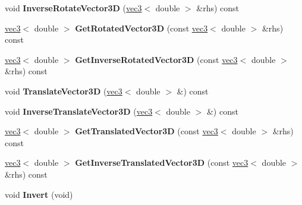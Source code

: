 \begin{DoxyCompactItemize}
\item 
\hypertarget{classmath_1_1mat44_a47e1b4c2b8a7402cbe2f810d9ad17e48}{
void {\bfseries InverseRotateVector3D} (\hyperlink{classmath_1_1vec3}{vec3}$<$ double $>$ \&rhs) const }
\label{classmath_1_1mat44_a47e1b4c2b8a7402cbe2f810d9ad17e48}

\item 
\hypertarget{classmath_1_1mat44_aef14aa49d3b4d63a891b7058516e9cb3}{
\hyperlink{classmath_1_1vec3}{vec3}$<$ double $>$ {\bfseries GetRotatedVector3D} (const \hyperlink{classmath_1_1vec3}{vec3}$<$ double $>$ \&rhs) const }
\label{classmath_1_1mat44_aef14aa49d3b4d63a891b7058516e9cb3}

\item 
\hypertarget{classmath_1_1mat44_a5cae23cf2b5f880e955b0a61590e9ccc}{
\hyperlink{classmath_1_1vec3}{vec3}$<$ double $>$ {\bfseries GetInverseRotatedVector3D} (const \hyperlink{classmath_1_1vec3}{vec3}$<$ double $>$ \&rhs) const }
\label{classmath_1_1mat44_a5cae23cf2b5f880e955b0a61590e9ccc}

\item 
\hypertarget{classmath_1_1mat44_ad89781736c0f006bb60be5683e5a707b}{
void {\bfseries TranslateVector3D} (\hyperlink{classmath_1_1vec3}{vec3}$<$ double $>$ \&) const }
\label{classmath_1_1mat44_ad89781736c0f006bb60be5683e5a707b}

\item 
\hypertarget{classmath_1_1mat44_afd776d21e9157bf6d874aa14c0e340b6}{
void {\bfseries InverseTranslateVector3D} (\hyperlink{classmath_1_1vec3}{vec3}$<$ double $>$ \&) const }
\label{classmath_1_1mat44_afd776d21e9157bf6d874aa14c0e340b6}

\item 
\hypertarget{classmath_1_1mat44_a00b596b2c158263d4f5ee44f6bf314ae}{
\hyperlink{classmath_1_1vec3}{vec3}$<$ double $>$ {\bfseries GetTranslatedVector3D} (const \hyperlink{classmath_1_1vec3}{vec3}$<$ double $>$ \&rhs) const }
\label{classmath_1_1mat44_a00b596b2c158263d4f5ee44f6bf314ae}

\item 
\hypertarget{classmath_1_1mat44_a3a507ad33927391da88d2aaa928b15e6}{
\hyperlink{classmath_1_1vec3}{vec3}$<$ double $>$ {\bfseries GetInverseTranslatedVector3D} (const \hyperlink{classmath_1_1vec3}{vec3}$<$ double $>$ \&rhs) const }
\label{classmath_1_1mat44_a3a507ad33927391da88d2aaa928b15e6}

\item 
\hypertarget{classmath_1_1mat44_a0c01cca98e876ad0c8f5c125dfe1feaf}{
void {\bfseries Invert} (void)}
\label{classmath_1_1mat44_a0c01cca98e876ad0c8f5c125dfe1feaf}


\end{DoxyCompactItemize}
